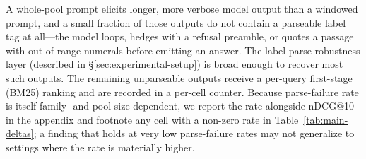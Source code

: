 A whole-pool prompt elicits longer, more verbose model output than a windowed prompt, and a small fraction of those outputs do not contain a parseable label tag at all---the model loops, hedges with a refusal preamble, or quotes a passage with out-of-range numerals before emitting an answer. The label-parse robustness layer (described in \S\ref{sec:experimental-setup}) is broad enough to recover most such outputs. The remaining unparseable outputs receive a per-query first-stage (BM25) ranking and are recorded in a per-cell counter. Because parse-failure rate is itself family- and pool-size-dependent, we report the rate alongside nDCG@10 in the appendix and footnote any cell with a non-zero rate in Table~\ref{tab:main-deltas}; a finding that holds at very low parse-failure rates may not generalize to settings where the rate is materially higher.

